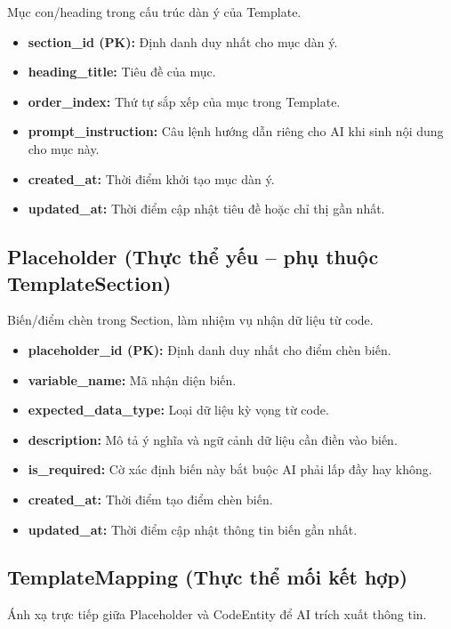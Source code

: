Mục con/heading trong cấu trúc dàn ý của Template.

\begin{itemize}
    \item \textbf{section\_id (PK):} Định danh duy nhất cho mục dàn ý.
    \item \textbf{heading\_title:} Tiêu đề của mục.
    \item \textbf{order\_index:} Thứ tự sắp xếp của mục trong Template.
    \item \textbf{prompt\_instruction:} Câu lệnh hướng dẫn riêng cho AI khi sinh nội dung cho mục này.
    \item \textbf{created\_at:} Thời điểm khởi tạo mục dàn ý.
    \item \textbf{updated\_at:} Thời điểm cập nhật tiêu đề hoặc chỉ thị gần nhất.
\end{itemize}


\subsection{Placeholder (Thực thể yếu -- phụ thuộc TemplateSection)}

Biến/điểm chèn trong Section, làm nhiệm vụ nhận dữ liệu từ code.

\begin{itemize}
    \item \textbf{placeholder\_id (PK):} Định danh duy nhất cho điểm chèn biến.
    \item \textbf{variable\_name:} Mã nhận diện biến.
    \item \textbf{expected\_data\_type:} Loại dữ liệu kỳ vọng từ code.
    \item \textbf{description:} Mô tả ý nghĩa và ngữ cảnh dữ liệu cần điền vào biến.
    \item \textbf{is\_required:} Cờ xác định biến này bắt buộc AI phải lấp đầy hay không.
    \item \textbf{created\_at:} Thời điểm tạo điểm chèn biến.
    \item \textbf{updated\_at:} Thời điểm cập nhật thông tin biến gần nhất.
\end{itemize}


\subsection{TemplateMapping (Thực thể mối kết hợp)}

Ánh xạ trực tiếp giữa Placeholder và CodeEntity để AI trích xuất thông tin.

